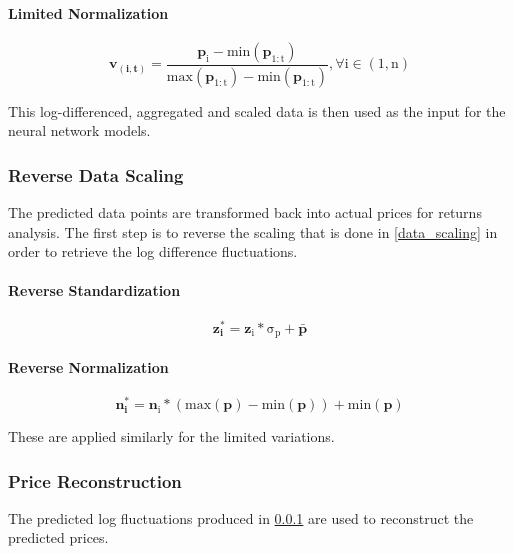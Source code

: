 \documentclass[a4paper,11pt,oneside]{article}
\theoremstyle{plain}
\theoremstyle{definition}
\begin{document}
	\paragraph{Limited Normalization}
	
	\begin{equation}
	\mathbf{v_{(i, t)}}  = \mathrm{ \frac{\mathbf{p}_i - min(\mathbf{p}_{1:t}) }{max(\mathbf{p}_{1:t}) - min(\mathbf{p}_{1:t})} , \forall  i \in (1, n)}
	\end{equation}
	
	
	This log-differenced, aggregated and scaled data is then used as the input for the neural network models.
	
	\subsubsection{Reverse Data Scaling}\label{data_reverse_scaling}
	
	The predicted data points are transformed back into actual prices for returns analysis. The first step is to reverse the scaling that is done in \ref{data_scaling} in order to retrieve the log difference fluctuations.
	
	\paragraph{Reverse Standardization}
	
	\begin{equation}
	\mathbf{z^{*}_i} = \mathrm{{\mathbf{z}_i} * \sigma_p + \mathbf{\bar{p}}}
	\end{equation}
	
	\paragraph{Reverse Normalization}
	
	\begin{equation}
	\mathbf{n^{*}_i} = \mathrm{\mathbf{n}_i * (max(\mathbf{p}) - min(\mathbf{p})) + min(\mathbf{p})}
	\end{equation}
	
	These are applied similarly for the limited variations.
	
	\subsubsection{Price Reconstruction}\label{data_price_recon}
	
	The predicted log fluctuations produced in \ref{data_reverse_scaling} are used to reconstruct the predicted prices. 
	
\end{document}
